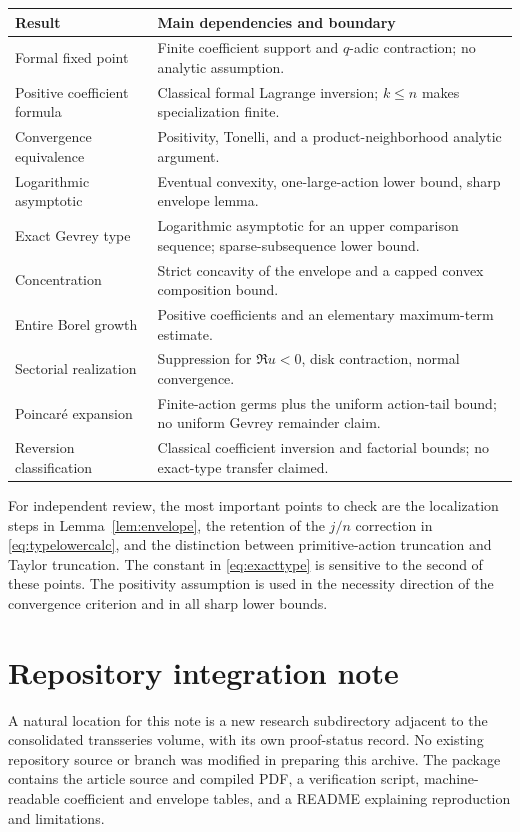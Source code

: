 \documentclass[11pt,a4paper]{article}
\numberwithin{equation}{section}
\theoremstyle{definition}
\theoremstyle{remark}
\begin{document}
\begin{center}
\small
\begin{tabular}{@{}p{}p{}@{}}
\toprule
Result & Main dependencies and boundary\\
\midrule
Formal fixed point & Finite coefficient support and $q$-adic contraction; no analytic assumption.\\
Positive coefficient formula & Classical formal Lagrange inversion; $k\le n$ makes specialization finite.\\
Convergence equivalence & Positivity, Tonelli, and a product-neighborhood analytic argument.\\
Logarithmic asymptotic & Eventual convexity, one-large-action lower bound, sharp envelope lemma.\\
Exact Gevrey type & Logarithmic asymptotic for an upper comparison sequence; sparse-subsequence lower bound.\\
Concentration & Strict concavity of the envelope and a capped convex composition bound.\\
Entire Borel growth & Positive coefficients and an elementary maximum-term estimate.\\
Sectorial realization & Suppression for $\Re u<0$, disk contraction, normal convergence.\\
Poincar\'e expansion & Finite-action germs plus the uniform action-tail bound; no uniform Gevrey remainder claim.\\
Reversion classification & Classical coefficient inversion and factorial bounds; no exact-type transfer claimed.\\
\bottomrule
\end{tabular}
\end{center}

For independent review, the most important points to check are the
localization steps in Lemma~\ref{lem:envelope}, the retention of the
$j/n$ correction in \eqref{eq:typelowercalc}, and the distinction between
primitive-action truncation and Taylor truncation.  The constant in
\eqref{eq:exacttype} is sensitive to the second of these points.
The positivity assumption is used in the necessity direction of the
convergence criterion and in all sharp lower bounds.

\section{Repository integration note}

A natural location for this note is a new research subdirectory adjacent
to the consolidated transseries volume, with its own proof-status record.
No existing repository source or branch was modified in preparing this
archive.  The package contains the article source and compiled PDF,
a verification script, machine-readable coefficient and envelope tables,
and a README explaining reproduction and limitations.
\end{document}
